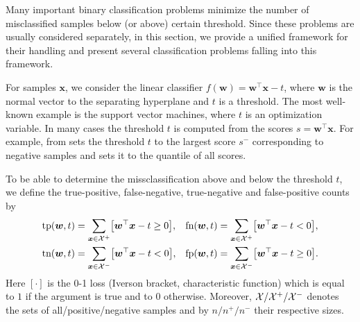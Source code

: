Many important binary classification problems minimize the number of misclassified samples below (or above) certain threshold. Since these problems are usually considered separately, in this section, we provide a unified framework for their handling and present several classification problems falling into this framework.

For samples $\bm{x}$, we consider the linear classifier $f(\bm{w}) = \bm{w}^\top \bm{x} - t$, where $\bm{w}$ is the normal vector to the separating hyperplane and $t$ is a threshold. The most well-known example is the support vector machines, where $t$ is an optimization variable. In many cases the threshold $t$ is computed from the scores $s = \bm{w}^\top \bm{x}$. For example, \TopPush from \cite{li2014top} sets the threshold $t$ to the largest score $s^-$ corresponding to negative samples and \cite{grill2016learning} sets it to the quantile of all scores.


To be able to determine the missclassification above and below the threshold $t$, we define the true-positive, false-negative, true-negative and false-positive counts by
\begin{equation}\label{eq:defin_counts}
  \begin{aligned}
    \tp(\bm{w}, t) & = \sum_{\bm{x} \in \Xc^+}\Brac[s]{\bm{w}^\top \bm{x} - t \ge 0}, &
    \fn(\bm{w}, t) & = \sum_{\bm{x} \in \Xc^+}\Brac[s]{\bm{w}^\top \bm{x} - t < 0}, \\
    \tn(\bm{w}, t) & = \sum_{\bm{x} \in \Xc^-}\Brac[s]{\bm{w}^\top \bm{x} - t < 0}, &
    \fp(\bm{w}, t) & = \sum_{\bm{x} \in \Xc^-}\Brac[s]{\bm{w}^\top \bm{x} - t \ge 0}.
  \end{aligned}
\end{equation}
Here $[\cdot]$ is the 0-1 loss (Iverson bracket, characteristic function) which is equal to $1$ if the argument is true and to $0$ otherwise. Moreover, $\mathcal{X} / \mathcal{X}^{+} / \mathcal{X}^{-}$ denotes the sets of all/positive/negative samples and by $n / n^{+} / n^{-}$ their respective sizes. 

